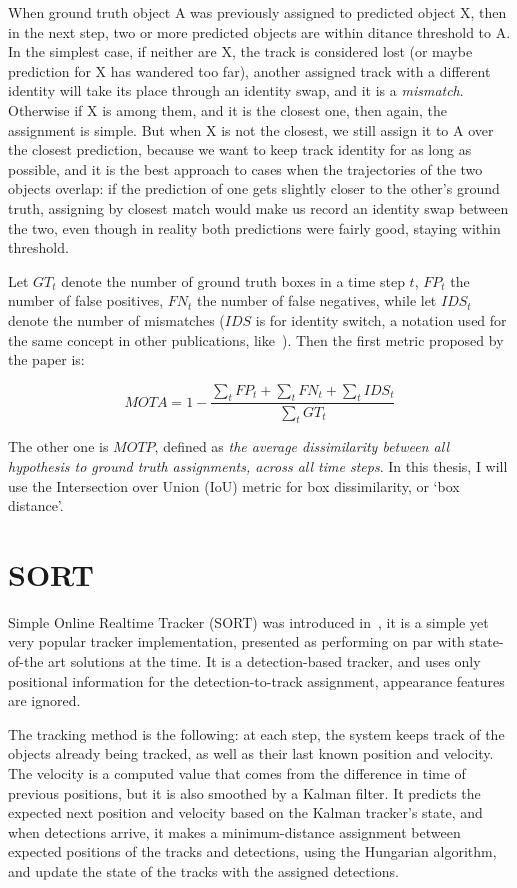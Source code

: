 When ground truth object A was previously assigned to predicted object X, then in the next step, two or more predicted objects are within ditance threshold to A. In the simplest case, if neither are X, the track is considered lost (or maybe prediction for X has wandered too far), another assigned track with a different identity will take its place through an identity swap, and it is a \textit{mismatch}. Otherwise if X is among them, and it is the closest one, then again, the assignment is simple. But when X is not the closest, we still assign it to A over the closest prediction, because we want to keep track identity for as long as possible, and it is the best approach to cases when the trajectories of the two objects overlap: if the prediction of one gets slightly closer to the other's ground truth, assigning by closest match would make us record an identity swap between the two, even though in reality both predictions were fairly good, staying within threshold.

Let $GT_t$ denote the number of ground truth boxes in a time step $t$, $FP_t$ the number of false positives, $FN_t$ the number of false negatives, while let $IDS_t$  denote the number of mismatches ($IDS$ is for identity switch, a notation used for the same concept in other publications, like~\cite{MOT15}). Then the first metric proposed by the paper is:

\[ MOTA = 1 - \frac{\sum_{t}{FP_t} + \sum_{t}{FN_t} + \sum_{t}{IDS_t}}{\sum_{t}{GT_t}} \]

The other one is $MOTP$, defined as \textit{the average dissimilarity between all hypothesis to ground truth assignments, across all time steps}. In this thesis, I will use the Intersection over Union (IoU) metric for box dissimilarity, or `box distance'.

\section{SORT}

Simple Online Realtime Tracker (SORT) was introduced in~\cite{Bewley_2016}, it is a simple yet very popular tracker implementation, presented as performing on par with state-of-the art solutions at the time. It is a detection-based tracker, and uses only positional information for the detection-to-track assignment, appearance features are ignored.

The tracking method is the following: at each step, the system keeps track of the objects already being tracked, as well as their last known position and velocity. The velocity is a computed value that comes from the difference in time of previous positions, but it is also smoothed by a Kalman filter. It predicts the expected next position and velocity based on the Kalman tracker's state, and when detections arrive, it makes a minimum-distance assignment between expected positions of the tracks and detections, using the Hungarian algorithm, and update the state of the tracks with the assigned detections.

